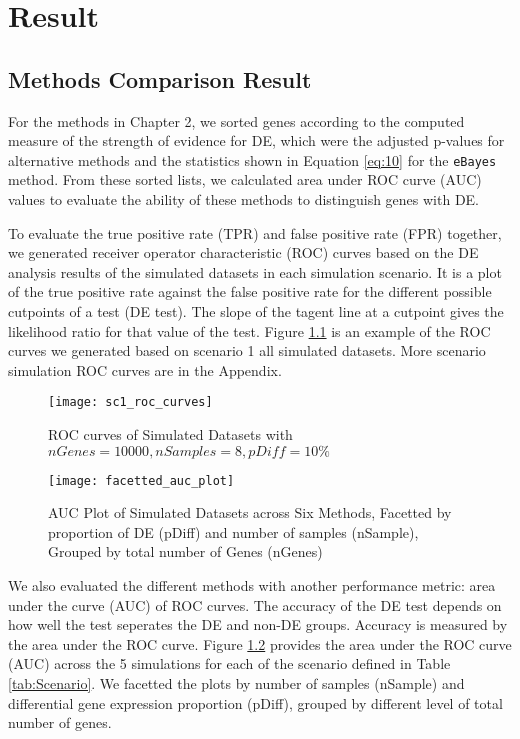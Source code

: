 \chapter{Result}

\section{Methods Comparison Result}

For the methods in Chapter 2, we sorted genes according to the computed measure of the strength of evidence for DE, which were the adjusted p-values for alternative methods and the statistics shown in Equation \eqref{eq:10} for the \texttt{eBayes} method. From these sorted lists, we calculated area under ROC curve (AUC) values to evaluate the ability of these methods to distinguish genes with DE. 

To evaluate the true positive rate (TPR) and false positive rate (FPR) together, we generated receiver operator characteristic (ROC) curves based on the DE analysis results of the simulated datasets in each simulation scenario. It is a plot of the true positive rate against the false positive rate for the different possible cutpoints of a test (DE test). The slope of the tagent line at a cutpoint gives the likelihood ratio for that value of the test. Figure \ref{sc1_roc_curves} is an example of the ROC curves we generated based on scenario 1 all simulated datasets. More scenario simulation ROC curves are in the Appendix. 

\begin{figure}[h!tb] 
\texttt{[image: sc1\_roc\_curves]}
\caption{ROC curves of Simulated Datasets with $nGenes=10000, nSamples=8, pDiff=10\%$}
\label{sc1_roc_curves}
\end{figure}


\begin{figure}[h!tb] 
\texttt{[image: facetted\_auc\_plot]}
\caption{AUC Plot of Simulated Datasets across Six Methods, Facetted by proportion of DE (pDiff) and number of samples (nSample), Grouped by total number of Genes (nGenes)}
\label{auc}
\end{figure}


We also evaluated the different methods with another performance metric: area under the curve (AUC) of ROC curves. The accuracy of the DE test depends on how well the test seperates the DE and non-DE groups. Accuracy is measured by the area under the ROC curve. Figure \ref{auc} provides the area under the ROC curve (AUC) across the 5 simulations for each of the scenario defined in Table \ref{tab:Scenario}. We facetted the plots by number of samples (nSample) and differential gene expression proportion (pDiff), grouped by different level of total number of genes. 

